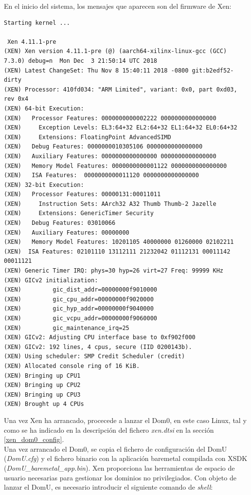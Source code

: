 En el inicio del sistema, los mensajes que aparecen son del firmware de Xen:
\begin{lstlisting}[style=CStyle]
Starting kernel ...

 Xen 4.11.1-pre
(XEN) Xen version 4.11.1-pre (@) (aarch64-xilinx-linux-gcc (GCC) 7.3.0) debug=n  Mon Dec  3 21:50:14 UTC 2018
(XEN) Latest ChangeSet: Thu Nov 8 15:40:11 2018 -0800 git:b2edf52-dirty
(XEN) Processor: 410fd034: "ARM Limited", variant: 0x0, part 0xd03, rev 0x4
(XEN) 64-bit Execution:
(XEN)   Processor Features: 0000000000002222 0000000000000000
(XEN)     Exception Levels: EL3:64+32 EL2:64+32 EL1:64+32 EL0:64+32
(XEN)     Extensions: FloatingPoint AdvancedSIMD
(XEN)   Debug Features: 0000000010305106 0000000000000000
(XEN)   Auxiliary Features: 0000000000000000 0000000000000000
(XEN)   Memory Model Features: 0000000000001122 0000000000000000
(XEN)   ISA Features:  0000000000011120 0000000000000000
(XEN) 32-bit Execution:
(XEN)   Processor Features: 00000131:00011011
(XEN)     Instruction Sets: AArch32 A32 Thumb Thumb-2 Jazelle
(XEN)     Extensions: GenericTimer Security
(XEN)   Debug Features: 03010066
(XEN)   Auxiliary Features: 00000000
(XEN)   Memory Model Features: 10201105 40000000 01260000 02102211
(XEN)  ISA Features: 02101110 13112111 21232042 01112131 00011142 00011121
(XEN) Generic Timer IRQ: phys=30 hyp=26 virt=27 Freq: 99999 KHz
(XEN) GICv2 initialization:
(XEN)         gic_dist_addr=00000000f9010000
(XEN)         gic_cpu_addr=00000000f9020000
(XEN)         gic_hyp_addr=00000000f9040000
(XEN)         gic_vcpu_addr=00000000f9060000
(XEN)         gic_maintenance_irq=25
(XEN) GICv2: Adjusting CPU interface base to 0xf902f000
(XEN) GICv2: 192 lines, 4 cpus, secure (IID 0200143b).
(XEN) Using scheduler: SMP Credit Scheduler (credit)
(XEN) Allocated console ring of 16 KiB.
(XEN) Bringing up CPU1
(XEN) Bringing up CPU2
(XEN) Bringing up CPU3
(XEN) Brought up 4 CPUs
\end{lstlisting}

Una vez Xen ha arrancado, procecede a lanzar el Dom0, en este caso Linux, tal y como se ha indicado en la descripción del fichero \textit{xen.dtsi} en la sección \ref{xen_dom0_config}.\\
Una vez arrancado el Dom0, se copia el fichero de configuración del DomU (\textit{DomU.cfg}) y el fichero binario con la aplicación baremetal compilada con \acrshort{XSDK} (\textit{DomU\_baremetal\_app.bin}). Xen proporciona las herramientas de espacio de usuario necesarias para gestionar los dominios no privilegiados. Con objeto de lanzar el DomU, es necesario introducir el siguiente comando de \textit{shell}:

